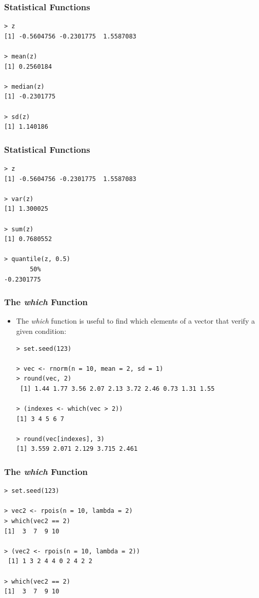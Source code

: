 \documentclass[xcolor=dvipsnames, xcolor=table]{beamer} %
\theoremstyle{mystyle}
\begin{document}
\begin{frame}[fragile]
\frametitle {Statistical Functions}

\begin{verbatim}
> z
[1] -0.5604756 -0.2301775  1.5587083

> mean(z)
[1] 0.2560184

> median(z)
[1] -0.2301775

> sd(z)
[1] 1.140186

\end{verbatim}

\end{frame}

\begin{frame}[fragile]
\frametitle{Statistical Functions}

\begin{verbatim}
> z
[1] -0.5604756 -0.2301775  1.5587083

> var(z)
[1] 1.300025

> sum(z)          
[1] 0.7680552

> quantile(z, 0.5)
       50% 
-0.2301775   
\end{verbatim}

\end{frame}
\begin{frame}[fragile]
\frametitle{The \textit{which} Function}

\begin{itemize}
\item The \textit{which} function is useful to find which elements of a vector that verify a given condition:

\begin{verbatim}
> set.seed(123)

> vec <- rnorm(n = 10, mean = 2, sd = 1)
> round(vec, 2)
 [1] 1.44 1.77 3.56 2.07 2.13 3.72 2.46 0.73 1.31 1.55

> (indexes <- which(vec > 2))
[1] 3 4 5 6 7

> round(vec[indexes], 3)
[1] 3.559 2.071 2.129 3.715 2.461

\end{verbatim}

\end{itemize}

\end{frame}

\begin{frame}[fragile]
\frametitle{The \textit{which} Function}

\begin{verbatim}
> set.seed(123)

> vec2 <- rpois(n = 10, lambda = 2)
> which(vec2 == 2)
[1]  3  7  9 10

> (vec2 <- rpois(n = 10, lambda = 2)) 
 [1] 1 3 2 4 4 0 2 4 2 2
 
> which(vec2 == 2)
[1]  3  7  9 10

\end{verbatim} 
\end{frame}
\end{document}
